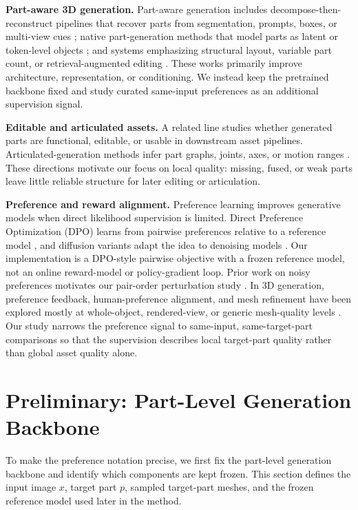 \documentclass[10pt,twocolumn,letterpaper]{article}
\begin{document}
\noindent\textbf{Part-aware 3D generation.}
Part-aware generation includes decompose-then-reconstruct pipelines that recover parts from segmentation, prompts, boxes, or multi-view cues \cite{chen2025partgen}; native part-generation methods that model parts as latent or token-level objects \cite{lin2025partcrafter,dong2025from,chen2025autopartgen}; and systems emphasizing structural layout, variable part count, or retrieval-augmented editing \cite{yang2025omnipart,tang2025efficient,li2026partrag}. These works primarily improve architecture, representation, or conditioning. We instead keep the pretrained backbone fixed and study curated same-input preferences as an additional supervision signal.

\noindent\textbf{Editable and articulated assets.}
A related line studies whether generated parts are functional, editable, or usable in downstream asset pipelines. Articulated-generation methods infer part graphs, joints, axes, or motion ranges \cite{liu2024singapo,liu2026pact}. These directions motivate our focus on local quality: missing, fused, or weak parts leave little reliable structure for later editing or articulation.

\noindent\textbf{Preference and reward alignment.}
Preference learning improves generative models when direct likelihood supervision is limited. Direct Preference Optimization (DPO) learns from pairwise preferences relative to a reference model \cite{rafailov2023direct}, and diffusion variants adapt the idea to denoising models \cite{wallace2024diffusiondpo}. Our implementation is a DPO-style pairwise objective with a frozen reference model, not an online reward-model or policy-gradient loop. Prior work on noisy preferences motivates our pair-order perturbation study \cite{raychowdhury2024robustdpo}. In 3D generation, preference feedback, human-preference alignment, and mesh refinement have been explored mostly at whole-object, rendered-view, or generic mesh-quality levels \cite{li2026circulardpo,zhou2025dreamdpoaligningtextto3dgeneration,liu2025meshrftenhancingmeshgeneration}.
Our study narrows the preference signal to same-input, same-target-part comparisons so that the supervision describes local target-part quality rather than global asset quality alone.

\section{Preliminary: Part-Level Generation Backbone}
To make the preference notation precise, we first fix the part-level generation backbone and identify which components are kept frozen. This section defines the input image $x$, target part $p$, sampled target-part meshes, and the frozen reference model used later in the method.
\end{document}
